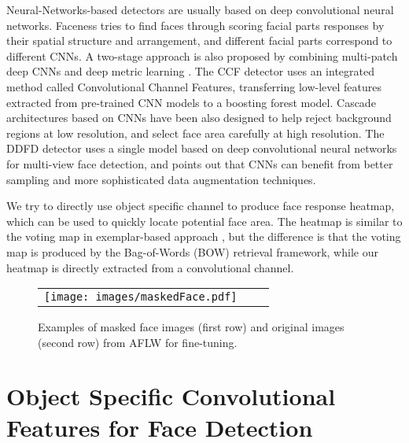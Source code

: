 \documentclass[10pt,twocolumn,letterpaper]{article}
\begin{document}
Neural-Networks-based detectors are usually based on deep convolutional neural networks. Faceness \cite{yang2015facial} tries to find faces through scoring facial parts responses by their spatial structure and arrangement, and different facial parts correspond to different CNNs. A two-stage approach is also proposed by combining multi-patch deep CNNs and deep metric learning \cite{liu2015targeting}. The CCF detector \cite{yang2015convolutional} uses an integrated method called Convolutional Channel Features, transferring low-level features extracted from pre-trained CNN models to a boosting forest model. Cascade architectures based on CNNs \cite{li2015convolutional} have been also designed to help reject background regions at low resolution, and select face area carefully at high resolution. The DDFD detector \cite{farfade2015multi} uses a single model based on deep convolutional neural networks for multi-view face detection, and points out that CNNs can benefit from better sampling and more sophisticated data augmentation techniques.

We try to directly use object specific channel to produce face response heatmap, which can be used to quickly locate potential face area. The heatmap is similar to the voting map in exemplar-based approach \cite{li2014efficient,kumar2015visual}, but the difference is that the voting map is produced by the Bag-of-Words (BOW) \cite{shekhar2012word} retrieval framework, while our heatmap is directly extracted from a convolutional channel.

\begin{figure*}
\begin{tabular}{ccc}
\rule{0pt}{1ex}\hspace{2.24mm}\texttt{[image: images/maskedFace.pdf]}\\[-0.1pt]
\end{tabular}
\caption{Examples of masked face images (first row) and original images (second row) from AFLW \cite{kostinger2011annotated} for fine-tuning.}
\label{fig:maskedFace}
\end{figure*}


\section{Object Specific Convolutional Features for Face Detection}
\end{document}
